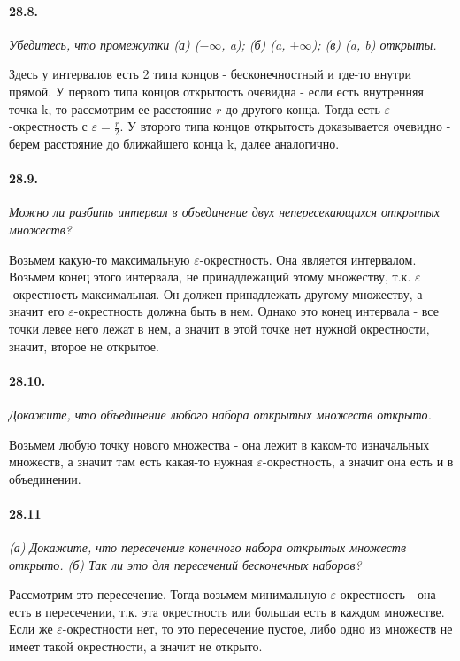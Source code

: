 \documentclass{book}
\begin{document}
\paragraph{28.8.}
\textit{Убедитесь, что промежутки (а) ($-\infty$, a); (б) (a, $+\infty$); (в) (a, b) открыты.}

Здесь у интервалов есть 2 типа концов - бесконечностный и где-то внутри прямой. У первого типа концов открытость очевидна - если есть внутренняя точка k, то рассмотрим ее расстояние $r$ до другого конца. Тогда есть $\varepsilon$-окрестность с $\varepsilon = \frac{r}{2}$.
У второго типа концов открытость доказывается очевидно - берем расстояние до ближайшего конца k, далее аналогично.

\paragraph{28.9.}
\textit{Можно ли разбить интервал в объединение двух непересекающихся открытых множеств?}

Возьмем какую-то максимальную $\varepsilon$-окрестность. Она является интервалом. Возьмем конец этого интервала, не принадлежащий этому множеству, т.к. $\varepsilon$-окрестность максимальная. Он должен принадлежать другому множеству, а значит его $\varepsilon$-окрестность должна быть в нем. Однако это конец интервала - все точки левее него лежат в нем, а значит в этой точке нет нужной окрестности, значит, второе не открытое. 

\paragraph{28.10.}
\textit{Докажите, что объединение любого набора открытых множеств открыто.}

Возьмем любую точку нового множества - она лежит в каком-то изначальных множеств, а значит там есть какая-то нужная $\varepsilon$-окрестность, а значит она есть и в объединении.\

\paragraph{28.11}
\textit{(а) Докажите, что пересечение конечного набора открытых множеств открыто. (б) Так ли это для пересечений бесконечных наборов?}

Рассмотрим это пересечение. Тогда возьмем минимальную $\varepsilon$-окрестность - она есть в пересечении, т.к. эта окрестность или большая есть в каждом множестве. Если же $\varepsilon$-окрестности нет, то это пересечение пустое, либо одно из множеств не имеет такой окрестности, а значит не открыто.
\end{document}

